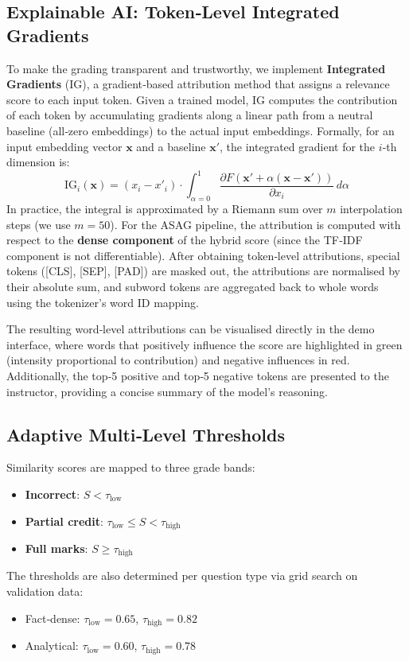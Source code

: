 \documentclass[11pt,a4paper]{article}
\begin{document}
\subsection{Explainable AI: Token‑Level Integrated Gradients}
\label{sec:xai}
To make the grading transparent and trustworthy, we implement \textbf{Integrated Gradients} (IG), a gradient‑based attribution method that assigns a relevance score to each input token. Given a trained model, IG computes the contribution of each token by accumulating gradients along a linear path from a neutral baseline (all‑zero embeddings) to the actual input embeddings. Formally, for an input embedding vector $\mathbf{x}$ and a baseline $\mathbf{x}'$, the integrated gradient for the $i$‑th dimension is:
\[
\text{IG}_i(\mathbf{x}) = (x_i - x'_i) \cdot \int_{\alpha=0}^{1} \frac{\partial F(\mathbf{x}' + \alpha (\mathbf{x} - \mathbf{x}'))}{\partial x_i} \, d\alpha
\]
In practice, the integral is approximated by a Riemann sum over $m$ interpolation steps (we use $m=50$). For the ASAG pipeline, the attribution is computed with respect to the \textbf{dense component} of the hybrid score (since the TF‑IDF component is not differentiable). After obtaining token‑level attributions, special tokens ([CLS], [SEP], [PAD]) are masked out, the attributions are normalised by their absolute sum, and subword tokens are aggregated back to whole words using the tokenizer's word ID mapping.

The resulting word‑level attributions can be visualised directly in the demo interface, where words that positively influence the score are highlighted in green (intensity proportional to contribution) and negative influences in red. Additionally, the top‑5 positive and top‑5 negative tokens are presented to the instructor, providing a concise summary of the model’s reasoning.

\subsection{Adaptive Multi‑Level Thresholds}
\label{sec:thresholds}
Similarity scores are mapped to three grade bands:
\begin{itemize}[noitemsep]
\item \textbf{Incorrect}: $S < \tau_{\text{low}}$
\item \textbf{Partial credit}: $\tau_{\text{low}} \le S < \tau_{\text{high}}$
\item \textbf{Full marks}: $S \ge \tau_{\text{high}}$
\end{itemize}
The thresholds are also determined per question type via grid search on validation data:
\begin{itemize}[noitemsep]
\item Fact‑dense: $\tau_{\text{low}} = 0.65$, $\tau_{\text{high}} = 0.82$
\item Analytical: $\tau_{\text{low}} = 0.60$, $\tau_{\text{high}} = 0.78$
\end{itemize}
\end{document}
